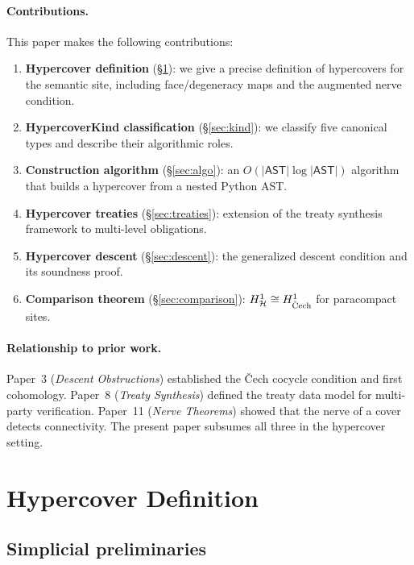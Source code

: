 \documentclass[11pt]{article}
\newcommand{\HC}{\mathcal{H}}              %
\newcommand{\AST}{\mathsf{AST}}           %
\begin{document}
\paragraph{Contributions.}
This paper makes the following contributions:
\begin{enumerate}[label=(\roman*)]
  \item \textbf{Hypercover definition} (\S\ref{sec:def}): we give a
    precise definition of hypercovers for the \JuGeo{} semantic site,
    including face/degeneracy maps and the augmented nerve condition.
  \item \textbf{HypercoverKind classification} (\S\ref{sec:kind}): we
    classify five canonical types and describe their algorithmic roles.
  \item \textbf{Construction algorithm} (\S\ref{sec:algo}): an
    $O(|\AST|\log|\AST|)$ algorithm that builds a hypercover from a
    nested Python AST.
  \item \textbf{Hypercover treaties} (\S\ref{sec:treaties}): extension
    of the treaty synthesis framework to multi-level obligations.
  \item \textbf{Hypercover descent} (\S\ref{sec:descent}): the
    generalized descent condition and its soundness proof.
  \item \textbf{Comparison theorem} (\S\ref{sec:comparison}):
    $\Hcoh{1}_{\HC} \cong \Hcoh{1}_{\mathrm{\check{C}ech}}$ for paracompact
    sites.
\end{enumerate}

\paragraph{Relationship to prior work.}
Paper~3 (\emph{Descent Obstructions}) established the Čech cocycle
condition and first cohomology.  Paper~8 (\emph{Treaty Synthesis})
defined the treaty data model for multi-party verification.  Paper~11
(\emph{Nerve Theorems}) showed that the nerve of a cover detects
connectivity.  The present paper subsumes all three in the hypercover
setting.

\section{Hypercover Definition}\label{sec:def}

\subsection{Simplicial preliminaries}
\end{document}
